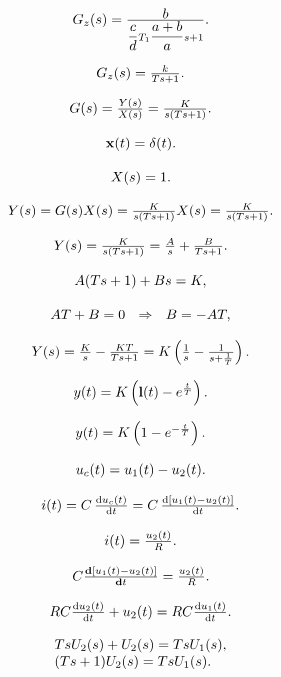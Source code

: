 \documentclass{article}
\begin{document}
\[
$$
G_{z} ( s )={\frac{\displaystyle b} {{\displaystyle\frac{c} {d}} T_{1} {\displaystyle\frac{a+b} {a}} s+1}}.
$$
\]

\[
$$
G_{z} ( s )=\frac{k} {T s+1}.
$$
\]

\[
$$
G ( s )=\frac{Y ( s )} {X ( s )}=\frac{K} {s ( T s+1 )}.
$$
\]

\[
$$
\mathbf{x} ( t )=\mathbf{\delta} ( t ).
$$
\]

\[
$$
X ( s )=1.
$$
\]

\[
$$
Y ( s )=G ( s ) X ( s )=\frac{K} {s ( T s+1 )} X ( s )=\frac{K} {s ( T s+1 )}.
$$
\]

\[
$$
Y ( s )=\frac{K} {s ( T s+1 )}=\frac{A} {s}+\frac{B} {T s+1}.
$$
\]

\[
$$
A ( T s+1 )+B s=K,
$$
\]

\[
$$
A T+B=0 \ \ \Rightarrow\ \ B=-A T,
$$
\]

\[
$$
Y ( s )=\frac{K} {s}-\frac{K T} {T s+1}=K \left( \frac{1} {s}-\frac{1} {s+\frac{1} {T}} \right).
$$
\]

\[
$$
y ( t )=K \left( \mathbf{l} ( t )-e^{\frac{t} {T}} \right).
$$
\]

\[
$$
y ( t )=K \left( 1-e^{-\frac{t} {T}} \right).
$$
\]

\[
$$
\textstyle u_{c} ( t )=u_{1} ( t )-u_{2} ( t ).
$$
\]

\[
$$
i ( t )=C \, {\frac{\mathrm{d} u_{c} \left( t \right)} {\mathrm{d} t}}=C \, {\frac{\mathrm{d} [ u_{1} \left( t \right)-u_{2} \left( t \right) ]} {\mathrm{d} t}}.
$$
\]

\[
$$
i ( t )=\frac{u_{2} ( t )} {R}.
$$
\]

\[
$$
C \frac{{\bf d} [ u_{1} ( t )-u_{2} ( t ) ]} {{\bf d} t}=\frac{u_{2} ( t )} {R}.
$$
\]

\[
$$
R C {\frac{\mathrm{d} u_{2} ( t )} {\mathrm{d} t}}+u_{2} ( t )=R C {\frac{\mathrm{d} u_{1} ( t )} {\mathrm{d} t}}.
$$
\]

\[
$$
\begin{array} {l} {T s U_{2} ( s )+U_{2} ( s )=T s U_{1} ( s ),} \\ {( T s+1 ) U_{2} ( s )=T s U_{1} ( s ).} \\ \end{array}
$$
\]
\end{document}
